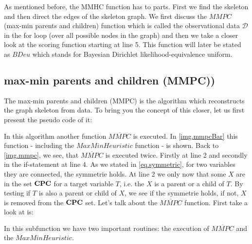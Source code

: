 		As mentioned before, the MMHC function has to parts. First we find the skeleton and then direct the edges of the skeleton graph. We first discuss the $MMPC$ (max-min parents and children) function which is called the observational data $\mathcal{D}$ in the for loop (over all possible nodes in the graph) and then we take a closer look at the scoring function starting at line 5. This function will later be stated as $BDeu$ which stands for Bayesian Dirichlet likelihood-equivalence uniform.

		\subsection{max-min parents and children (MMPC))}

			The max-min parents and children (MMPC) is the algorithm which reconstructs the graph skeleton from data. To bring you the concept of this closer, let us first present the pseudo code of it:

			 \label{img.mmpc}

			In this algorithm another function $\overline{MMPC}$ is executed. In \autoref{img.mmpcBar} this function - including the $MaxMinHeuristic$ function - is shown. Back to \autoref{img.mmpc}, we see, that $\overline{MMPC}$ is executed twice. Firstly at line 2 and secondly in the if-statement at line 4. As we stated in \autoref{eq.symmetric}, for two variables they are connected, the symmetrie holds. At line 2 we only now that some $X$ are in the set ${\textbf{CPC}}$ for a target variable $T$, i.e. the $X$ is a parent or a child of $T$. By testing if $T$ is also a parent or child of $X$, we see if the symmetrie holds, if not, $X$ is removed from the ${\textbf{CPC}}$ set. Let's talk about the $\overline{MMPC}$ function. First take a look at is:

			 \label{img.mmpcBar}

			In this subfunction we have two important routines: the execution of $\overline{MMPC}$ and the $MaxMinHeuristic$.

